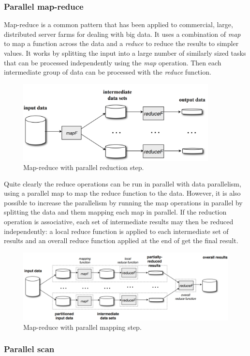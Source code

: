 \documentclass[CS4204-Notes.tex]{subfiles}
\begin{document}
\subsubsection{Parallel map-reduce}
Map-reduce is a common pattern that has been applied to commercial, large, distributed server farms for dealing with big data. It uses a combination of \textit{map} to map a function across the data and a \textit{reduce} to reduce the results to simpler values. It works by splitting the input into a large number of similarly sized tasks that can be processed independently using the \textit{map} operation. Then each intermediate group of data can be processed with the \textit{reduce} function. 
\begin{figure}[H]
\centering
\includegraphics[width=0.9\textwidth, keepaspectratio]{imgs/map-reduce-simple.png}
\caption{Map-reduce with parallel reduction step.}
\end{figure}
\noindent
Quite clearly the reduce operations can be run in parallel with data parallelism, using a parallel map to map the reduce function to the data. However, it is also possible to increase the parallelism by running the map operations in parallel by splitting the data and them mapping each map in parallel. If the reduction operation is associative, each set of intermediate results may then be reduced independently: a local reduce function is applied to each intermediate set of results and an overall reduce function applied at the end of get the final result. 
\begin{figure}[H]
\centering
\includegraphics[width=1\textwidth, keepaspectratio]{imgs/map-reduce-more.png}
\caption{Map-reduce with parallel mapping step.}
\end{figure}

\subsubsection{Parallel scan}
\end{document}
